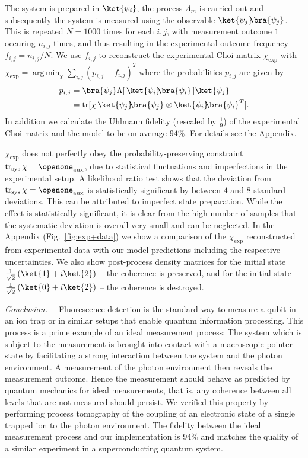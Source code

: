 \documentclass[
aps,prl,
reprint,
a4paper,
superscriptaddress,
floatfix,
]{revtex4-1}
\DeclareMathOperator{\argmin}{arg\,min}
\DeclareMathOperator{\tr}{tr}
\newcommand{\ketbra}[2]{{\ket{#1}\!\!\bra{#2}}}
\newcommand{\proj}[1]{{\ketbra{#1}{#1}}}
\begin{document}
The system is prepared in $\ket{\psi_i}$, the process $\Lambda_m$ is carried out and
 subsequently the system is measured using the observable $\proj{\psi_j}$.
This is repeated $N=1000$ times for each $i,j$, with measurement outcome $1$ occuring $n_{i,j}$ times, and thus resulting in the experimental outcome frequency $f_{i,j}=n_{i,j}/N$.
We use $f_{i,j}$ to reconstruct the experimental Choi matrix $\chi_\mathrm{exp}$ with $\chi_\mathrm{exp}= \argmin_\chi \sum_{i,j} (p_{i,j}-f_{i,j})^2$
where the probabilities $p_{i,j}$ are given by
\begin{equation}\begin{split}
 p_{i,j} &= \bra{\psi_j}\Lambda[\,\proj{\psi_i}\,]\ket{\psi_j} \\
         &= \tr[\chi\, \proj{\psi_j}\otimes \proj{\psi_i}^T].
\end{split}\end{equation}
In addition we calculate the Uhlmann fidelity (rescaled by $\frac{1}{9}$) of the experimental Choi matrix and the model to be on average $94\%$.
For details see the Appendix.

$\chi_\mathrm{exp}$ does not perfectly obey the 
 probability-preserving constraint $\tr_\mathrm{sys}\chi= 
 \openone_\mathrm{aux}$, due to statistical fluctuations and imperfections in 
 the experimental setup.
A likelihood ratio test shows that the deviation from $\tr_\mathrm{sys}\chi= 
 \openone_\mathrm{aux}$ is statistically significant by between $4$ and $8$ 
 standard deviations.
This can be attributed to imperfect state preparation.
While the effect is statistically significant, it is clear from the high number 
 of samples that the systematic deviation is overall very small and can be 
 neglected.
In the Appendix (Fig.~\ref{fig:exp+data})  we show a comparison of the $\chi_{\mathrm{exp}}$ reconstructed from experimental data
 with our model predictions including the respective uncertainties.
We also show post-process density matrices for the initial state
 $\frac{1}{\sqrt{2}} \left(\ket{1} + i\ket{2}\right)$ -- the coherence is preserved, and for the initial state $\frac{1}{\sqrt{2}}\left(\ket{0} + i\ket{2}\right)$ -- the coherence is destroyed.
 
{\em Conclusion.---}%
Fluorescence detection is the standard way to measure a qubit in an ion trap or 
 in similar setups that enable quantum information processing.
This process is a prime example of an ideal measurement process:
The system which is subject to the measurement is brought into contact with a 
 macroscopic pointer state by facilitating a strong interaction between the system 
 and the photon environment.
A measurement of the photon environment then reveals the measurement outcome.
Hence the measurement should behave as predicted by quantum mechanics for 
 ideal measurements, that is, any coherence between all levels 
 that are not measured should persist.
We verified this property by 
 performing process tomography of the coupling of an electronic state of a single trapped ion to the photon environment.
The fidelity between the ideal measurement process and our implementation is 
 $94\%$ and matches the quality of a similar experiment \cite{Jerger16} in a 
 superconducting quantum system.
\end{document}
